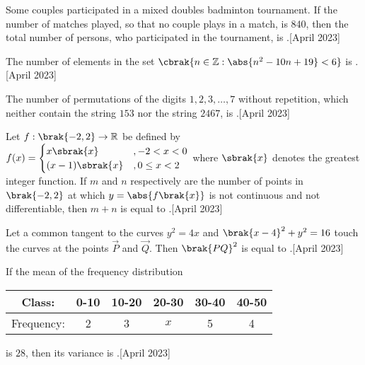 \iffalse
\title{2023}
\author{ee24btech11009}
\section{integer}
\fi
\item Some couples participated in a mixed doubles badminton tournament. If the number of matches played, so that no couple plays in a match, is 840, then the total number of persons, who participated in the tournament, is \underline{\hspace{1cm}}.\hfill{[April 2023]}
\item The number of elements in the set $\cbrak{n \in \mathbb{Z} :\abs{ n^2 - 10n + 19} < 6 }$ is \underline{\hspace{1cm}}.\hfill{[April 2023]}
\item The number of permutations of the digits $1, 2, 3, \dots, 7$ without repetition, which neither contain the string $153$ nor the string $2467$, is \underline{\hspace{1cm}}.\hfill{[April 2023]}
\item Let $f: \brak{-2, 2} \to \mathbb{R}$ be defined by
$f(x) = \begin{cases}
x\sbrak{x} & , -2 < x < 0 \\
(x-1)\sbrak{x} & , 0 \leq x < 2
\end{cases}$
where $\sbrak{x}$ denotes the greatest integer function. If $m$ and $n$ respectively are the number of points in $\brak{-2, 2}$ at which $y =\abs{f\brak{x}}$ is not continuous and not differentiable, then $m + n$ is equal to \underline{\hspace{1cm}}.\hfill{[April 2023]}
\item Let a common tangent to the curves $y^2 = 4x$ and $\brak{x - 4}^2 + y^2 = 16$ touch the curves at the points $\vec{P}$ and $\vec{Q}$. Then $\brak{PQ}^2$ is equal to \underline{\hspace{1cm}}.\hfill{[April 2023]}
\item If the mean of the frequency distribution
\begin{table}[h!]
\centering
\begin{tabular}{|c|c|c|c|c|c|}
\hline
Class: & 0-10 & 10-20 & 20-30 & 30-40 & 40-50 \\
\hline
Frequency: & 2 & 3 & $x$ & 5 & 4 \\
\hline
\end{tabular}
\end{table}
is $28$, then its variance is \underline{\hspace{1cm}}.\hfill{[April 2023]}
